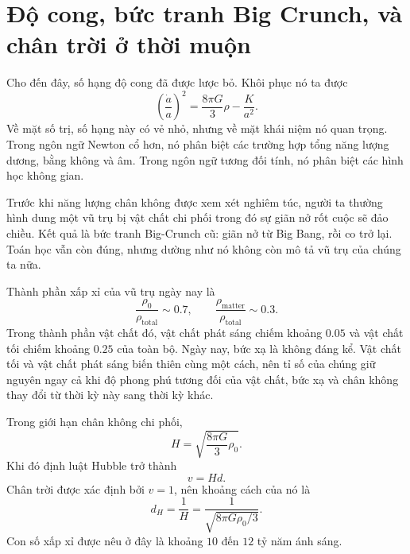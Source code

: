 \section{Độ cong, bức tranh Big Crunch, và chân trời ở thời muộn}

Cho đến đây, số hạng độ cong đã được lược bỏ. Khôi phục nó ta được
\begin{equation}
\left(\frac{\dot a}{a}\right)^2
=
\frac{8\pi G}{3}\rho
-
\frac{K}{a^2}.
\end{equation}
Về mặt số trị, số hạng này có vẻ nhỏ, nhưng về mặt khái niệm nó quan trọng. Trong ngôn ngữ Newton cổ hơn, nó phân biệt các trường hợp tổng năng lượng dương, bằng không và âm. Trong ngôn ngữ tương đối tính, nó phân biệt các hình học không gian.

Trước khi năng lượng chân không được xem xét nghiêm túc, người ta thường hình dung một vũ trụ bị vật chất chi phối trong đó sự giãn nở rốt cuộc sẽ đảo chiều. Kết quả là bức tranh Big-Crunch cũ: giãn nở từ Big Bang, rồi co trở lại. Toán học vẫn còn đúng, nhưng dường như nó không còn mô tả vũ trụ của chúng ta nữa.

\begin{classroomqa}
\end{classroomqa}

Thành phần xấp xỉ của vũ trụ ngày nay là
\begin{equation}
\frac{\rho_0}{\rho_{\text{total}}}\sim 0.7,
\qquad
\frac{\rho_{\text{matter}}}{\rho_{\text{total}}}\sim 0.3.
\end{equation}
Trong thành phần vật chất đó, vật chất phát sáng chiếm khoảng \(0.05\) và vật chất tối chiếm khoảng \(0.25\) của toàn bộ. Ngày nay, bức xạ là không đáng kể. Vật chất tối và vật chất phát sáng biến thiên cùng một cách, nên tỉ số của chúng giữ nguyên ngay cả khi độ phong phú tương đối của vật chất, bức xạ và chân không thay đổi từ thời kỳ này sang thời kỳ khác.

Trong giới hạn chân không chi phối,
\begin{equation}
H=\sqrt{\frac{8\pi G}{3}\rho_0}.
\end{equation}
Khi đó định luật Hubble trở thành
\begin{equation}
v=Hd.
\end{equation}
Chân trời được xác định bởi \(v=1\), nên khoảng cách của nó là
\begin{equation}
d_H=\frac{1}{H}
=
\frac{1}{\sqrt{8\pi G\rho_0/3}}.
\end{equation}
Con số xấp xỉ được nêu ở đây là khoảng \(10\) đến \(12\) tỷ năm ánh sáng.

